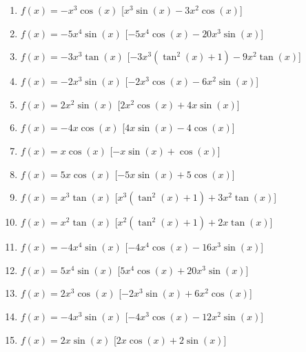 \begin{enumerate}
\begin{enumerate}
\item \(f(x) = - x^{3} \cos{\left (x \right )}\) \hfill [\(x^{3} \sin{\left (x 
\right )} - 3 x^{2} \cos{\left (x \right )}\)]
\item \(f(x) = - 5 x^{4} \sin{\left (x \right )}\) \hfill [\(- 5 x^{4} 
\cos{\left (x \right )} - 20 x^{3} \sin{\left (x \right )}\)]
\item \(f(x) = - 3 x^{3} \tan{\left (x \right )}\) \hfill [\(- 3 x^{3} 
\left(\tan^{2}{\left (x \right )} + 1\right) - 9 x^{2} \tan{\left (x \right 
)}\)]
\item \(f(x) = - 2 x^{3} \sin{\left (x \right )}\) \hfill [\(- 2 x^{3} 
\cos{\left (x \right )} - 6 x^{2} \sin{\left (x \right )}\)]
\item \(f(x) = 2 x^{2} \sin{\left (x \right )}\) \hfill [\(2 x^{2} \cos{\left (x 
\right )} + 4 x \sin{\left (x \right )}\)]
\item \(f(x) = - 4 x \cos{\left (x \right )}\) \hfill [\(4 x \sin{\left (x 
\right )} - 4 \cos{\left (x \right )}\)]
\item \(f(x) = x \cos{\left (x \right )}\) \hfill [\(- x \sin{\left (x \right )} 
+ \cos{\left (x \right )}\)]
\item \(f(x) = 5 x \cos{\left (x \right )}\) \hfill [\(- 5 x \sin{\left (x 
\right )} + 5 \cos{\left (x \right )}\)]
\item \(f(x) = x^{3} \tan{\left (x \right )}\) \hfill [\(x^{3} 
\left(\tan^{2}{\left (x \right )} + 1\right) + 3 x^{2} \tan{\left (x \right 
)}\)]
\item \(f(x) = x^{2} \tan{\left (x \right )}\) \hfill [\(x^{2} 
\left(\tan^{2}{\left (x \right )} + 1\right) + 2 x \tan{\left (x \right )}\)]
\item \(f(x) = - 4 x^{4} \sin{\left (x \right )}\) \hfill [\(- 4 x^{4} 
\cos{\left (x \right )} - 16 x^{3} \sin{\left (x \right )}\)]
\item \(f(x) = 5 x^{4} \sin{\left (x \right )}\) \hfill [\(5 x^{4} \cos{\left (x 
\right )} + 20 x^{3} \sin{\left (x \right )}\)]
\item \(f(x) = 2 x^{3} \cos{\left (x \right )}\) \hfill [\(- 2 x^{3} \sin{\left 
(x \right )} + 6 x^{2} \cos{\left (x \right )}\)]
\item \(f(x) = - 4 x^{3} \sin{\left (x \right )}\) \hfill [\(- 4 x^{3} 
\cos{\left (x \right )} - 12 x^{2} \sin{\left (x \right )}\)]
\item \(f(x) = 2 x \sin{\left (x \right )}\) \hfill [\(2 x \cos{\left (x \right 
)} + 2 \sin{\left (x \right )}\)]
\end{enumerate}



\end{enumerate}
